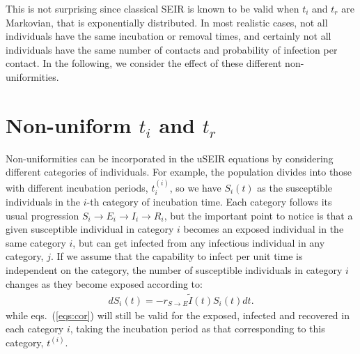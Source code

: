 \documentclass[a4paper,oneside,11pt]{article}
\begin{document}
  This is not surprising since classical SEIR is known to be valid when  $t_i$ and $t_r$ are Markovian, that is  exponentially distributed. In most realistic cases, not all individuals have the same incubation or removal times, and certainly not all individuals have the same number of contacts and probability of infection per contact. In the following, we consider the effect of these different non-uniformities.

\section{Non-uniform $t_i$ and $t_r$ }
\label{sec:titr}

 Non-uniformities can be incorporated in the uSEIR equations by considering different categories of individuals. For example, the population divides   into those with different incubation periods, $t_i^{(i)}$, so we have $S_i(t)$ as the susceptible individuals in the $i$-th category of incubation time. Each category follows its usual progression $S_i\rightarrow E_i \rightarrow I_i \rightarrow R_i$, but the important point to notice is that a given susceptible individual in category $i$ becomes an exposed individual in the same category $i$, but can get infected from any infectious individual in any category, $j$. If we assume that the capability to infect per unit time is independent on the category, the number of susceptible individuals in category $i$ changes as they become exposed according to:
\begin{eqnarray}
d S_i(t) = - r_{S\rightarrow E} \tilde{I}(t) S_i(t) dt.
\end{eqnarray}
while eqs.~(\ref{eqs:cor}) will still be valid for the exposed, infected and recovered in each category $i$, taking the incubation period as that corresponding to this category, $t^{(i)}$.
\end{document}
